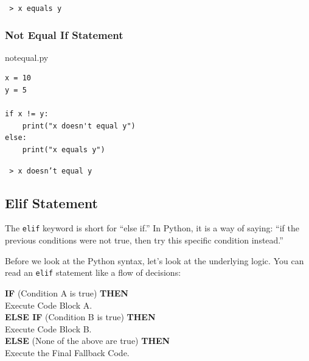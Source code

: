 \documentclass{report}
\begin{document}
\begin{terminal}
\texttt{\color{terminalFont} > x equals y }\\
\end{terminal}

\subsubsection*{Not Equal If Statement}
\begin{vscode}{notequal.py}
\begin{lstlisting}[style=vscodeStyle]
x = 10
y = 5

if x != y:
    print("x doesn't equal y")
else:
    print("x equals y")
\end{lstlisting}
\end{vscode}

\begin{terminal}
\texttt{\color{terminalFont} > x doesn't equal y }\\
\end{terminal}

\subsection{Elif Statement}
The \texttt{elif} keyword is short for ``else if.'' In Python, it is a way of saying: ``if the previous conditions were not true, then try this specific condition instead.''

Before we look at the Python syntax, let's look at the underlying logic. You can read an \texttt{elif} statement like a flow of decisions:



\begin{logicbox}
    \textbf{IF} (Condition A is true) \textbf{THEN} \\
    \hspace*{2em} Execute Code Block A. \\
    \textbf{ELSE IF} (Condition B is true) \textbf{THEN} \\
    \hspace*{2em} Execute Code Block B. \\
    \textbf{ELSE} (None of the above are true) \textbf{THEN} \\
    \hspace*{2em} Execute the Final Fallback Code.
\end{logicbox}
\end{document}
